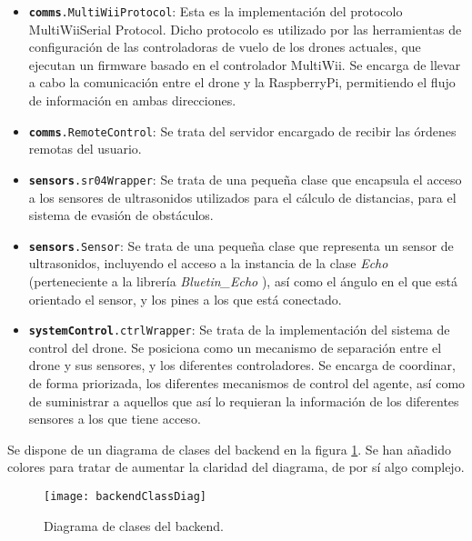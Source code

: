 \begin{itemize}
\item \texttt{\textbf{comms}.MultiWiiProtocol}: Esta es la implementación del protocolo MultiWiiSerial Protocol. Dicho protocolo es utilizado por las herramientas de configuración de las controladoras de vuelo de los drones actuales, que ejecutan un firmware basado en el controlador MultiWii. Se encarga de llevar a cabo la comunicación entre el drone y la RaspberryPi, permitiendo el flujo de información en ambas direcciones. 
\item \texttt{\textbf{comms}.RemoteControl}: Se trata del servidor encargado de recibir las órdenes remotas del usuario.
\item \texttt{\textbf{sensors}.sr04Wrapper}: Se trata de una pequeña clase que encapsula el acceso a los sensores de ultrasonidos utilizados para el cálculo de distancias, para el sistema de evasión de obstáculos.
\item \texttt{\textbf{sensors}.Sensor}: Se trata de una pequeña clase que representa un sensor de ultrasonidos, incluyendo el acceso a la instancia de la clase \emph{Echo} (perteneciente a la librería \emph{Bluetin\_Echo} ), así como el ángulo en el que está orientado el sensor, y los pines a los que está conectado.
\item \texttt{\textbf{systemControl}.ctrlWrapper}: Se trata de la implementación del sistema de control del drone. Se posiciona como un mecanismo de separación entre el drone y sus sensores, y los diferentes controladores. Se encarga de coordinar, de forma priorizada, los diferentes mecanismos de control del agente, así como de suministrar a aquellos que así lo requieran la información de los diferentes sensores a los que tiene acceso.
\end{itemize}

Se dispone de un diagrama de clases del backend en la figura \ref{fig:backendClassDiag}. Se han añadido colores para tratar de aumentar la claridad del diagrama, de por sí algo complejo.
\newpage



\begin{figure}[H]
	\centering
	\texttt{[image: backendClassDiag]}
	\caption[Diagrama de clases BackEnd]{Diagrama de clases del backend.}\label{fig:backendClassDiag}
\end{figure}





















